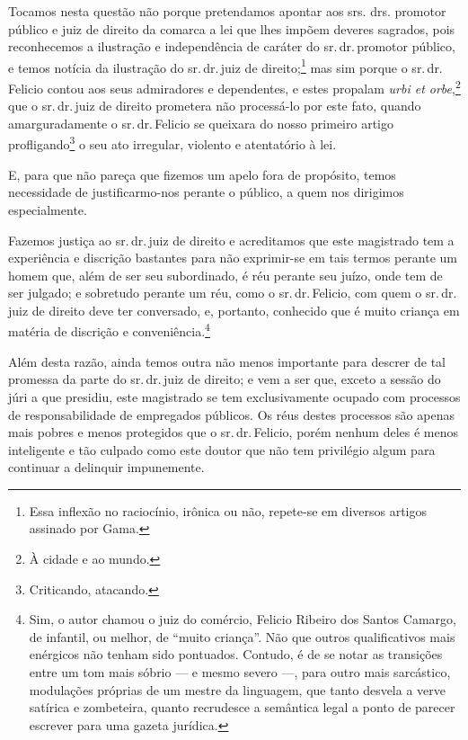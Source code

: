 Tocamos nesta questão não porque pretendamos apontar aos srs. drs.
promotor público e juiz de direito da comarca a lei que lhes impõem
deveres sagrados, pois reconhecemos a ilustração e independência de
caráter do sr.\,dr.\,promotor público, e temos notícia da ilustração do
sr.\,dr.\,juiz de direito;\footnote{ Essa inflexão no raciocínio, irônica
  ou não, repete-se em diversos artigos assinado por Gama.} mas sim
porque o sr.\,dr.\,Felicio contou aos seus admiradores e dependentes, e
estes propalam \emph{urbi et orbe},\footnote{ À cidade e ao mundo.} que
o sr.\,dr.\,juiz de direito prometera não processá-lo por este fato,
quando amarguradamente o sr.\,dr.\,Felicio se queixara do nosso primeiro
artigo profligando\footnote{ Criticando, atacando.} o seu ato
irregular, violento e atentatório à lei.

E, para que não pareça que fizemos um apelo fora de propósito, temos
necessidade de justificarmo-nos perante o público, a quem nos dirigimos
especialmente.

Fazemos justiça ao sr.\,dr.\,juiz de direito e acreditamos que este
magistrado tem a experiência e discrição bastantes para não exprimir-se
em tais termos perante um homem que, além de ser seu subordinado, é réu
perante seu juízo, onde tem de ser julgado; e sobretudo perante um réu,
como o sr.\,dr.\,Felicio, com quem o sr.\,dr.\,juiz de direito deve ter
conversado, e, portanto, conhecido que é muito criança em matéria de
discrição e conveniência.\footnote{ Sim, o autor chamou o juiz do
  comércio, Felicio Ribeiro dos Santos Camargo, de infantil, ou melhor,
  de ``muito criança''. Não que outros qualificativos mais enérgicos não
  tenham sido pontuados. Contudo, é de se notar as transições entre um
  tom mais sóbrio --- e mesmo severo ---, para outro mais sarcástico,
  modulações próprias de um mestre da linguagem, que tanto desvela a
  verve satírica e zombeteira, quanto recrudesce a semântica legal a
  ponto de parecer escrever para uma gazeta jurídica.}

Além desta razão, ainda temos outra não menos importante para descrer de
tal promessa da parte do sr.\,dr.\,juiz de direito; e vem a ser que,
exceto a sessão do júri a que presidiu, este magistrado se tem
exclusivamente ocupado com processos de responsabilidade de empregados
públicos. Os réus destes processos são apenas mais pobres e menos
protegidos que o sr.\,dr.\,Felicio, porém nenhum deles é menos inteligente
e tão culpado como este doutor que não tem privilégio algum para
continuar a delinquir impunemente.

